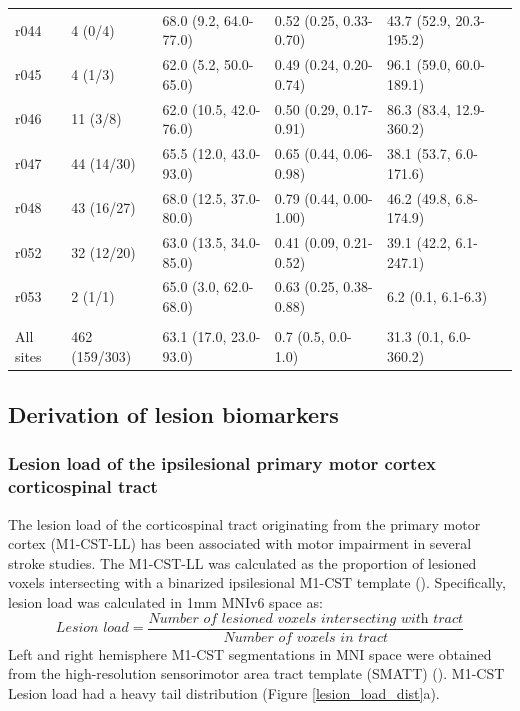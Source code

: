 \documentclass[10pt]{article}
\begin{document}
\begin{table}[h]
\begin{tabular}{llllll}
r044 & 4 (0/4) & 68.0 (9.2, 64.0-77.0) & 0.52 (0.25, 0.33-0.70) & 43.7 (52.9, 20.3-195.2) \\
r045 & 4 (1/3) & 62.0 (5.2, 50.0-65.0) & 0.49 (0.24, 0.20-0.74) & 96.1 (59.0, 60.0-189.1) \\
r046 & 11 (3/8) & 62.0 (10.5, 42.0-76.0) & 0.50 (0.29, 0.17-0.91) & 86.3 (83.4, 12.9-360.2) \\
r047 & 44 (14/30) & 65.5 (12.0, 43.0-93.0) & 0.65 (0.44, 0.06-0.98) & 38.1 (53.7, 6.0-171.6) \\
r048 & 43 (16/27) & 68.0 (12.5, 37.0-80.0) & 0.79 (0.44, 0.00-1.00) & 46.2 (49.8, 6.8-174.9) \\
r052 & 32 (12/20) & 63.0 (13.5, 34.0-85.0) & 0.41 (0.09, 0.21-0.52) & 39.1 (42.2, 6.1-247.1) \\
r053 & 2 (1/1) & 65.0 (3.0, 62.0-68.0) & 0.63 (0.25, 0.38-0.88) & 6.2 (0.1, 6.1-6.3) \\
\hline\\
All sites & 462 (159/303) & 63.1 (17.0, 23.0-93.0) & 0.7 (0.5, 0.0-1.0) & 31.3 (0.1, 6.0-360.2)  \\
\bottomrule
\end{tabular}
\end{table}




\subsection{Derivation of lesion biomarkers}
\subsubsection*{Lesion load of the ipsilesional primary motor cortex corticospinal tract}
The lesion load of the corticospinal tract originating from the primary motor cortex (M1-CST-LL) has been associated with motor impairment in several stroke studies. The M1-CST-LL was calculated as the proportion of lesioned voxels intersecting with a binarized ipsilesional M1-CST template (\cite{Zhu2010-qh}). Specifically, lesion load was calculated in 1mm MNIv6 space as:
\begin{equation}
    \textit{Lesion load} = \frac{\textit{Number of lesioned voxels intersecting with  tract}}{\textit{Number of voxels in tract}}
\end{equation}
Left and right hemisphere M1-CST segmentations in MNI space were obtained from the high-resolution sensorimotor area tract template (SMATT) (\cite{Archer2018-ti}). M1-CST Lesion load had a heavy tail distribution (Figure \ref{lesion_load_dist}a).
 
\end{document}
